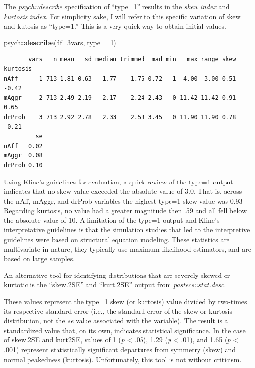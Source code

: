 \documentclass[
  11pt,
]{book}
\newenvironment{Shaded}{\begin{snugshade}}{\end{snugshade}}
\newcommand{\AttributeTok}[1]{\textcolor[rgb]{0.27,0.27,0.27}{#1}}
\newcommand{\DecValTok}[1]{\textcolor[rgb]{0.06,0.06,0.06}{#1}}
\newcommand{\FunctionTok}[1]{\textcolor[rgb]{0.27,0.27,0.27}{\textbf{#1}}}
\newcommand{\NormalTok}[1]{#1}
\newcommand{\SpecialCharTok}[1]{\textcolor[rgb]{0.43,0.43,0.43}{\textbf{#1}}}
\begin{document}
The \emph{psych::describe} specification of ``type=1'' results in the \emph{skew index} and \emph{kurtosis index}. For simplicity sake, I will refer to this specific variation of skew and kutosis as ``type=1.'' This is a very quick way to obtain initial values.

\begin{Shaded}
\begin{Highlighting}[]
\NormalTok{psych}\SpecialCharTok{::}\FunctionTok{describe}\NormalTok{(df\_3vars, }\AttributeTok{type =} \DecValTok{1}\NormalTok{)}
\end{Highlighting}
\end{Shaded}

\begin{verbatim}
       vars   n mean   sd median trimmed  mad min   max range skew kurtosis
nAff      1 713 1.81 0.63   1.77    1.76 0.72   1  4.00  3.00 0.51    -0.42
mAggr     2 713 2.49 2.19   2.17    2.24 2.43   0 11.42 11.42 0.91     0.65
drProb    3 713 2.92 2.78   2.33    2.58 3.45   0 11.90 11.90 0.78    -0.21
         se
nAff   0.02
mAggr  0.08
drProb 0.10
\end{verbatim}

Using Kline's \citeyearpar{kline_data_2016} guidelines for evaluation, a quick review of the type=1 output indicates that no skew value exceeded the absolute value of 3.0. That is, across the nAff, mAggr, and drProb variables the highest type=1 skew value was 0.93 Regarding kurtosis, no value had a greater magnitude then .59 and all fell below the absolute value of 10. A limitation of the type=1 output and Kline's interpretative guidelines is that the simulation studies that led to the interpretive guidelines were based on structural equation modeling. These statistics are multivariate in nature, they typically use maximum likelihood estimators, and are based on large samples.

An alternative tool for identifying distributions that are severely skewed or kurtotic is the ``skew.2SE'' and ``kurt.2SE'' output from \emph{pastecs::stat.desc}.

These values represent the type=1 skew (or kurtosis) value divided by two-times its respective standard error (i.e., the standard error of the skew or kurtosis distribution, not the \emph{se} value associated with the variable). The result is a standardized value that, on its own, indicates statistical significance. In the case of skew.2SE and kurt2SE, values of 1 (\emph{p} \textless{} .05), 1.29 (\emph{p} \textless{} .01), and 1.65 (\emph{p} \textless{} .001) represent statistically significant departures from symmetry (skew) and normal peakedness (kurtosis). Unfortunately, this tool is not without criticism.
\end{document}
